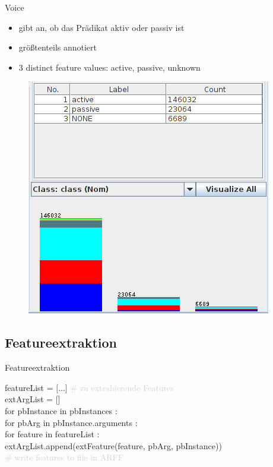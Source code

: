 \documentclass[10pt]{beamer}
\begin{document}
  \begin{frame}{Voice}
   \begin{itemize}
    \item gibt an, ob das Prädikat aktiv oder passiv ist
    \item größtenteils annotiert
    \item 3 distinct feature values: active, passive, unknown
   \end{itemize}
  \begin{figure}
	  \begin{center}
	  	\includegraphics[scale=0.3]{voice}
	  \end{center}
  \end{figure}
  \end{frame}
  



\subsection{Featureextraktion}

\begin{frame}{Featureextraktion} 
\begin{small}
\hspace{10pt} featureList = $[$...$]$ \textcolor{lightgray}{\# zu extrahierende Features} \\
\hspace{10pt} extArgList = [] \\
\hspace{10pt} for pbInstance in pbInstances : \\
\hspace{30pt} 	for pbArg in pbInstance.arguments : \\
\hspace{30pt} 	for feature in featureList : \\
\hspace{50pt}	extArgList.append(extFeature(feature, pbArg, pbInstance)) \\
\hspace{10pt}   	\textcolor{lightgray}{ \# write features to file in ARFF} \\
\end{small}
\end{frame}
\end{document}
